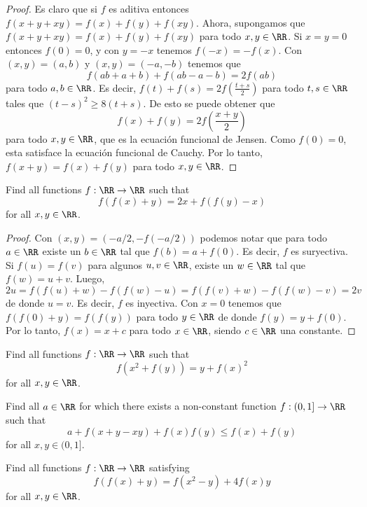 \begin{proof}
  Es claro que si $f$ es aditiva entonces $f(x+y+xy)=f(x)+f(y)+f(xy)$. Ahora,
  supongamos que $f(x+y+xy)=f(x)+f(y)+f(xy)$ para todo $x,y\in\RR$. Si $x=y=0$
  entonces $f(0)=0$, y con $y=-x$ tenemos $f(-x)=-f(x)$. Con $(x,y)=(a,b)$ y
  $(x,y)=(-a,-b)$ tenemos que
  \[f(ab+a+b)+f(ab-a-b)=2f(ab)\]
  para todo $a,b\in\RR$. Es decir, $f(t)+f(s)=2f\left(\frac{t+s}{2}\right)$ para
  todo $t,s\in\RR$ tales que $(t-s)^2\ge 8(t+s)$. De esto se puede obtener que
  \[f(x)+f(y)=2f\left(\frac{x+y}{2}\right)\]
  para todo $x,y\in\RR$, que es la ecuación funcional de Jensen. Como $f(0)=0$,
  esta satisface la ecuación funcional de Cauchy. Por lo tanto,
  $f(x+y)=f(x)+f(y)$ para todo $x,y\in\RR$.
\end{proof}

\begin{probEG}[ISL 2002/A1]
  Find all functions $f:\RR\to\RR$ such that
  \[f(f(x)+y)=2x+f(f(y)-x)\]
  for all $x,y\in\RR$.
\end{probEG}

\begin{proof}
  Con $(x,y)=(-a/2,-f(-a/2))$ podemos notar que para todo $a\in\RR$ existe un
  $b\in\RR$ tal que $f(b)=a+f(0)$. Es decir, $f$ es suryectiva. Si $f(u)=f(v)$
  para algunos $u,v\in\RR$, existe un $w\in\RR$ tal que $f(w)=u+v$. Luego,
  \[2u=f(f(u)+w)-f(f(w)-u)=f(f(v)+w)-f(f(w)-v)=2v\]
  de donde $u=v$. Es decir, $f$ es inyectiva. Con $x=0$ tenemos que
  $f(f(0)+y)=f(f(y))$ para todo $y\in\RR$ de donde $f(y)=y+f(0)$. Por lo tanto,
  $f(x)=x+c$ para todo $x\in\RR$, siendo $c\in\RR$ una constante.
\end{proof}


\begin{probEG}
  Find all functions $f:\RR\to\RR$ such that
  \[f(x^2+f(y))=y+f(x)^2\]
  for all $x,y\in\RR$.
\end{probEG}

\begin{probEG}
  Find all $a\in\RR$ for which there exists a non-constant function
  $f:(0,1]\to\RR$ such that
  \[a+f(x+y-xy)+f(x)f(y)\le f(x)+f(y)\]
  for all $x,y\in(0,1]$.
\end{probEG}

\begin{probEG}
  Find all functions $f:\RR\to\RR$ satisfying
  \[f(f(x)+y)=f(x^2-y)+4f(x)y\]
  for all $x,y\in\RR$.
\end{probEG}


